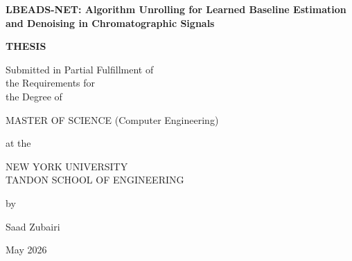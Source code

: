\documentclass[12pt,draft,letterpaper]{report}
\newcommand{\thesistitle}{LBEADS-NET: Algorithm Unrolling for Learned Baseline Estimation and Denoising in Chromatographic Signals}
\newcommand{\thesisauthor}{Saad Zubairi}
\newcommand{\graddate}{May 2026} %
\begin{document}

\thispagestyle{empty}
\begin{center}
{\bfseries 
  {\large\thesistitle}
  \vspace{1in}
  
 {\large {\bf THESIS}}\\
  \vspace{.5in}
  
  \begin{doublespace}
  {\large  
  Submitted in Partial Fulfillment of\\
  the Requirements for\\
  the Degree of\\}
  \end{doublespace}
  \vspace{.5in}
  
  {\large MASTER OF SCIENCE (Computer Engineering)}\\
  \vspace{.5in}
  
  at the \\
  \vspace{.2in}
  
  {\large
  NEW YORK UNIVERSITY\\
  \vspace{-0.05in}
  TANDON SCHOOL OF ENGINEERING\\
  }
  \vspace{.2in}
  
  by
  \vspace{.5in}

  {\large\thesisauthor}
  \vspace{.5in}

  {\large\graddate}
}

\end{center}

\newpage
\end{document}
